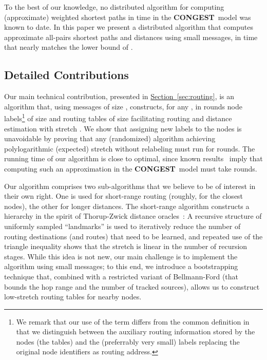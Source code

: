 \documentclass[letterpaper,11pt]{article}
\newcommand{\namedref}[2]{\hyperref[#2]{#1~\ref*{#2}}}
\newcommand{\sectionref}[1]{\namedref{Section}{#1}}
\newcommand{\CONGEST}{\textbf{CONGEST}}
\begin{document}
To the best of our knowledge, no distributed algorithm for computing
(approximate) weighted shortest paths in  time in the \CONGEST\ model
was known to date. In this paper we present a distributed algorithm  that
computes approximate all-pairs shortest paths and distances using small
messages, in time that nearly matches the lower bound of
.

\subsection{Detailed Contributions}

Our main technical contribution, presented in \sectionref{sec:routing}, is an
algorithm that, using messages of size , constructs, for any
, in  rounds node
labels\footnote{We remark that our use of the term differs from the common
definition in that we distinguish between the auxiliary routing information
stored by the nodes (the tables) and the (preferrably very small) labels
replacing the original node identifiers as routing address.} of size  and routing tables of size
 facilitating routing and distance estimation
with stretch . We show that
assigning new labels to the nodes is unavoidable by proving that any
(randomized) algorithm achieving polylogarithmic (expected) stretch without
relabeling must run for  rounds.
The running time of our algorithm is close to optimal, since known
results~\cite{DHKNPPW-11,Elkin-MST,PelegR-00} imply that computing such an
approximation in the \CONGEST\ model must take 
rounds.



Our algorithm comprises two sub-algorithms that we believe to be of interest in
their own right. One is used for short-range routing (roughly, for the closest
 nodes), the other for longer distances. The short-range algorithm
constructs a hierarchy in the spirit of Thorup-Zwick distance
oracles~\cite{TZ-05}: A recursive structure of uniformly sampled ``landmarks''
is used to iteratively reduce the number of routing destinations (and routes)
that need to be learned, and repeated use of the triangle inequality shows that
the stretch is linear in the number of recursion stages. While this idea is not
new, our main challenge is to implement the algorithm using small messages; to
this end, we introduce a bootstrapping technique that, combined with a
restricted variant of Bellmann-Ford (that bounds the hop range and the number of
tracked sources), allows us to construct low-stretch routing tables for nearby
nodes.
\end{document}

